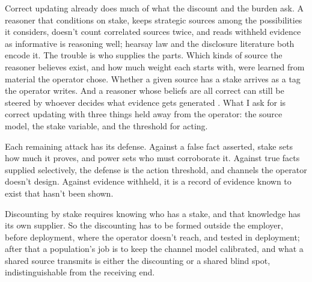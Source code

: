 Correct updating already does much of what the discount and the burden ask. A reasoner that conditions on stake, keeps strategic sources among the possibilities it considers, doesn't count correlated sources twice, and reads withheld evidence as informative is reasoning well; hearsay law and the disclosure literature both encode it. The trouble is who supplies the parts. Which kinds of source the reasoner believes exist, and how much weight each starts with, were learned from material the operator chose. Whether a given source has a stake arrives as a tag the operator writes. And a reasoner whose beliefs are all correct can still be steered by whoever decides what evidence gets generated \autocite{Kamenica2011BayesianPersuasion}. What I ask for is correct updating with three things held away from the operator: the source model, the stake variable, and the threshold for acting.

Each remaining attack has its defense. Against a false fact asserted, stake sets how much it proves, and power sets who must corroborate it. Against true facts supplied selectively, the defense is the action threshold, and channels the operator doesn't design. Against evidence withheld, it is a record of evidence known to exist that hasn't been shown.


Discounting by stake requires knowing who has a stake, and that knowledge has its own supplier.
So the discounting has to be formed outside the employer, before deployment, where the operator doesn't reach, and tested in deployment; after that a population's job is to keep the channel model calibrated, and what a shared source transmits is either the discounting or a shared blind spot, indistinguishable from the receiving end.

